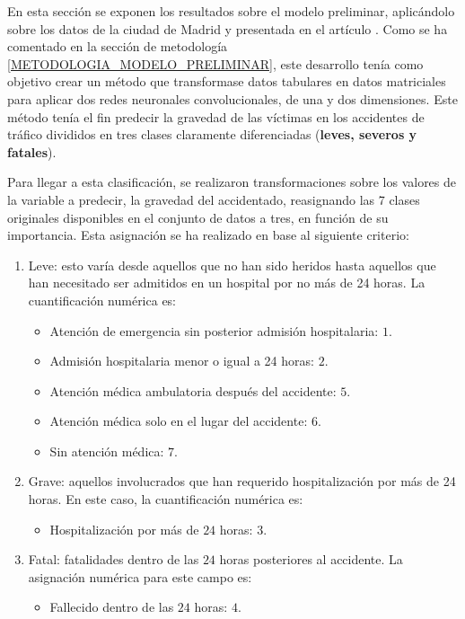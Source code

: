 

En esta sección se exponen los resultados sobre el modelo preliminar, aplicándolo sobre los datos de la ciudad de Madrid y presentada en el artículo \cite{PEREZSALA2023113245}. Como se ha comentado en la sección de metodología \ref{METODOLOGIA_MODELO_PRELIMINAR}, este desarrollo tenía como objetivo crear un método que transformase datos tabulares en datos matriciales para aplicar dos redes neuronales convolucionales, de una y dos dimensiones. Este método tenía el fin predecir la gravedad de las víctimas en los accidentes de tráfico divididos en tres clases claramente diferenciadas (\textbf{leves, severos y fatales}). 

Para llegar a esta clasificación, se realizaron transformaciones sobre los valores de la variable a predecir, la gravedad del accidentado, reasignando las 7 clases originales disponibles en el conjunto de datos a tres, en función de su importancia. Esta asignación se ha realizado en base al siguiente criterio:

\begin{enumerate}
	\item Leve: esto varía desde aquellos que no han sido heridos hasta aquellos que han necesitado ser admitidos en un hospital por no más de 24 horas. La cuantificación numérica es:
	\begin{itemize}
		\item Atención de emergencia sin posterior admisión hospitalaria: $1$.
		\item Admisión hospitalaria menor o igual a 24 horas: $2$.
		\item Atención médica ambulatoria después del accidente: $5$.
		\item Atención médica solo en el lugar del accidente: $6$.
		\item Sin atención médica: $7$.
	\end{itemize}
	\item Grave: aquellos involucrados que han requerido hospitalización por más de 24 horas. En este caso, la cuantificación numérica es:
	\begin{itemize}
		\item Hospitalización por más de $24$ horas: $3$.
	\end{itemize}
	\item Fatal: fatalidades dentro de las $24$ horas posteriores al accidente. La asignación numérica para este campo es:
	\begin{itemize}
		\item Fallecido dentro de las $24$ horas: $4$.
	\end{itemize}
\end{enumerate}

